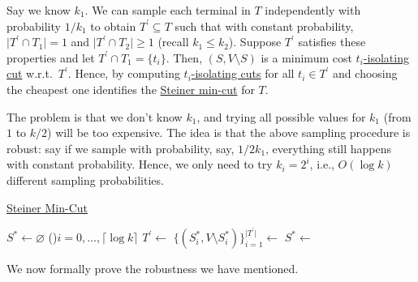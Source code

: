 Say we know \(k_1\). We can sample each terminal in \(T\) independently with probability \(1 / k_1\) to obtain \(T^{\prime} \subseteq T\) such that with constant probability, \(\lvert T^{\prime} \cap T_1 \rvert = 1\) and \(\lvert T^{\prime} \cap T_2 \rvert \geq 1\) (recall \(k_1 \leq k_2\)). Suppose \(T^{\prime} \) satisfies these properties and let \(T^{\prime} \cap T_1 = \{ t_i \} \). Then, \((S, V\setminus S)\) is a minimum cost \hyperref[prb:isolating-cut]{\(t_i\)-isolating cut} w.r.t.\ \(T^{\prime} \). Hence, by computing \hyperref[prb:isolating-cut]{\(t_i\)-isolating cuts} for all \(t_i \in T^{\prime} \) and choosing the cheapest one identifies the \hyperref[prb:Steiner-min-cut]{Steiner min-cut} for \(T\).

The problem is that we don't know \(k_1\), and trying all possible values for \(k_1\) (from \(1\) to \(k / 2\)) will be too expensive. The idea is that the above sampling procedure is robust: say if we sample with probability, say, \(1 / 2k_1\), everything still happens with constant probability. Hence, we only need to try \(k_i = 2^i\), i.e., \(O(\log k)\) different sampling probabilities.

\begin{algorithm}[H]\label{algo:Steiner-min-cut}
	\DontPrintSemicolon{}
	\caption{\hyperref[prb:Steiner-min-cut]{Steiner Min-Cut}}
	\BlankLine

	\(S^{\ast} \gets \varnothing \)
	\For(){\(i = 0, \dots , \lceil \log k \rceil \)}{
	\(T^{\prime} \gets\)
	\(\{ (S_i^{\ast} , V\setminus S_i^{\ast} ) \}_{i=1}^{\lvert T^{\prime} \rvert } \gets\)\;
	\(S^{\ast} \gets \)
	}
	\;
\end{algorithm}

We now formally prove the robustness we have mentioned.

